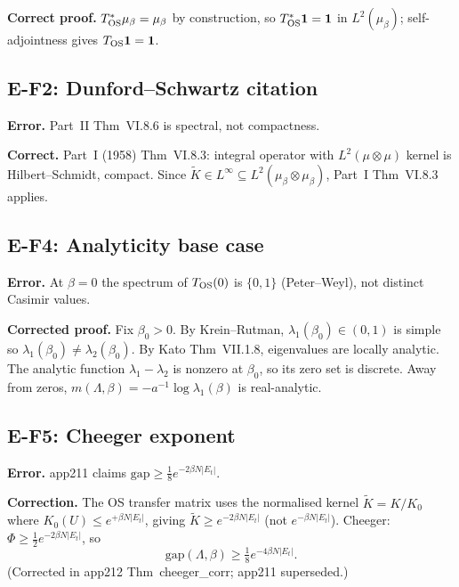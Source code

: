 \textbf{Correct proof.} $T_{\rm OS}^*\mu_\beta=\mu_\beta$ by construction, so $T_{\rm OS}^*\mathbf{1}=\mathbf{1}$ in $L^2(\mu_\beta)$; self-adjointness gives $T_{\rm OS}\mathbf{1}=\mathbf{1}$.

\subsection{E-F2: Dunford--Schwartz citation}
\label{ssec:f2}

\textbf{Error.} Part~II Thm~VI.8.6 is spectral, not compactness.

\textbf{Correct.} Part~I (1958) Thm~VI.8.3: integral operator with $L^2(\mu\otimes\mu)$ kernel is Hilbert--Schmidt, compact. Since $\tilde{K}\in L^\infty\subseteq L^2(\mu_\beta\otimes\mu_\beta)$, Part~I Thm~VI.8.3 applies.

\subsection{E-F4: Analyticity base case}
\label{ssec:f4}

\textbf{Error.} At $\beta=0$ the spectrum of $T_{\rm OS}(0)$ is $\{0,1\}$ (Peter--Weyl), not distinct Casimir values.

\textbf{Corrected proof.} Fix $\beta_0>0$. By Krein--Rutman, $\lambda_1(\beta_0)\in(0,1)$ is simple so $\lambda_1(\beta_0)\ne\lambda_2(\beta_0)$. By Kato Thm~VII.1.8, eigenvalues are locally analytic. The analytic function $\lambda_1-\lambda_2$ is nonzero at $\beta_0$, so its zero set is discrete. Away from zeros, $m(\Lambda,\beta)=-a^{-1}\log\lambda_1(\beta)$ is real-analytic.

\subsection{E-F5: Cheeger exponent}
\label{ssec:f5}

\textbf{Error.} app211 claims $\mathrm{gap}\ge\tfrac{1}{8}e^{-2\beta N|E_t|}$.

\textbf{Correction.} The OS transfer matrix uses the normalised kernel $\tilde{K}=K/K_0$ where $K_0(U)\le e^{+\beta N|E_t|}$, giving $\tilde{K}\ge e^{-2\beta N|E_t|}$ (not $e^{-\beta N|E_t|}$). Cheeger: $\Phi\ge\tfrac{1}{2}e^{-2\beta N|E_t|}$, so
\begin{equation}
\label{eq:cheeger_fix}
  \mathrm{gap}(\Lambda,\beta)\ge\tfrac{1}{8}e^{-4\beta N|E_t|}.
\end{equation}
(Corrected in app212 Thm~cheeger\_corr; app211 superseded.)

